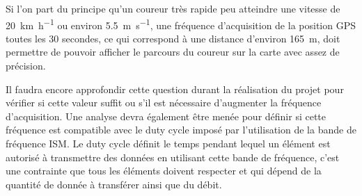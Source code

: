 Si l’on part du principe qu’un coureur très rapide peu atteindre une vitesse de \SI{20}{\km\per\hour} ou environ \SI{5.5}{\m\per\s}, une fréquence d’acquisition de la position GPS toutes les 30 secondes, ce qui correspond à une distance d’environ \SI{165}{\m}, doit permettre de pouvoir afficher le parcours du coureur sur la carte avec assez de précision. 

Il faudra encore approfondir cette question durant la réalisation du projet pour vérifier si cette valeur suffit ou s’il est nécessaire d’augmenter la fréquence d’acquisition. Une analyse devra également être menée pour définir si cette fréquence est compatible avec le duty cycle imposé par l’utilisation de la bande de fréquence ISM. Le duty cycle définit le temps pendant lequel un élément est autorisé à transmettre des données en utilisant cette bande de fréquence, c’est une contrainte que tous les éléments doivent respecter et qui dépend de la quantité de donnée à transférer ainsi que du débit.
